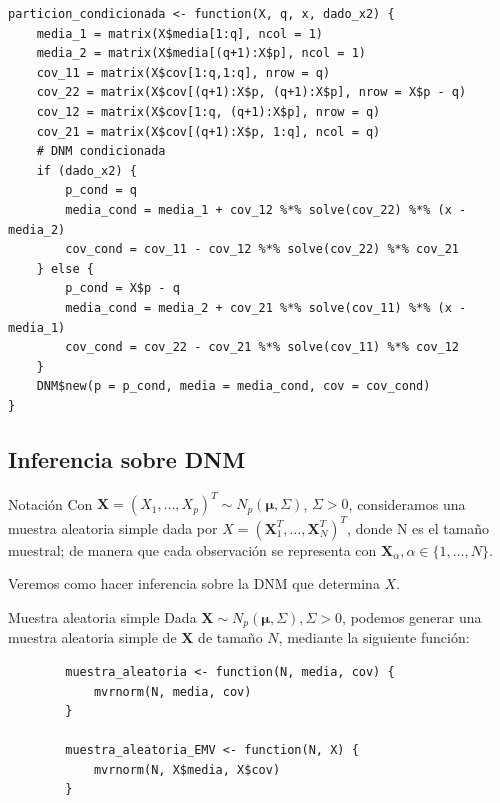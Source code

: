 \documentclass[xcolor=table]{beamer}
\begin{document}
\begin{frame}[fragile]
\scriptsize
\begin{lstlisting}
particion_condicionada <- function(X, q, x, dado_x2) {
    media_1 = matrix(X$media[1:q], ncol = 1)
    media_2 = matrix(X$media[(q+1):X$p], ncol = 1)
    cov_11 = matrix(X$cov[1:q,1:q], nrow = q)
    cov_22 = matrix(X$cov[(q+1):X$p, (q+1):X$p], nrow = X$p - q)
    cov_12 = matrix(X$cov[1:q, (q+1):X$p], nrow = q)
    cov_21 = matrix(X$cov[(q+1):X$p, 1:q], ncol = q)
    # DNM condicionada
    if (dado_x2) {
        p_cond = q
        media_cond = media_1 + cov_12 %*% solve(cov_22) %*% (x - media_2)
        cov_cond = cov_11 - cov_12 %*% solve(cov_22) %*% cov_21
    } else {
        p_cond = X$p - q
        media_cond = media_2 + cov_21 %*% solve(cov_11) %*% (x - media_1)
        cov_cond = cov_22 - cov_21 %*% solve(cov_11) %*% cov_12
    }
    DNM$new(p = p_cond, media = media_cond, cov = cov_cond)
}
\end{lstlisting}
\end{frame}

\subsection{Inferencia sobre DNM}

\begin{frame}[fragile]{Notación}
Con $\pmb{X} = (X_1, \ldots, X_p)^T \sim N_p(\pmb{\mu}, \Sigma)$, $\Sigma > 0$, consideramos una muestra aleatoria simple dada por $X = (\pmb{X}_1^T, \ldots, \pmb{X}_N^T)^T$, donde N es el tamaño muestral; de manera que cada observación se representa con $\pmb{X}_\alpha, \alpha \in \{1, \ldots, N\}$.

Veremos como hacer inferencia sobre la DNM que determina $X$.
\end{frame}


\begin{frame}[fragile]{Muestra aleatoria simple}
Dada $\pmb{X} \sim N_p(\pmb{\mu}, \Sigma), \Sigma > 0$, podemos generar una muestra aleatoria simple de $\pmb{X}$ de tamaño $N$, mediante la siguiente función:

	\begin{lstlisting}
		muestra_aleatoria <- function(N, media, cov) {
    		mvrnorm(N, media, cov)
		}

		muestra_aleatoria_EMV <- function(N, X) {
			mvrnorm(N, X$media, X$cov)
		}
	\end{lstlisting}

\end{frame}
\end{document}
